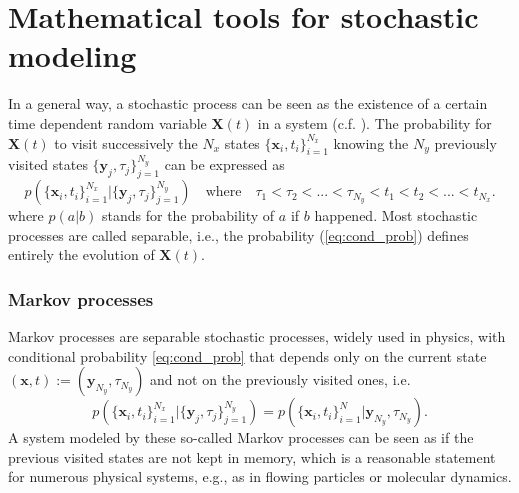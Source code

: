 \section{Mathematical tools for stochastic modeling}
In a general way, a stochastic process can be seen as the existence of a certain time dependent random variable $\textbf{X}(t)$ in a system (c.f. \citet[Sec. 3.1]{Gardiner1996}). The probability for $\textbf{X}(t)$ to visit successively the $N_x$ states $\{\textbf{x}_i,t_i\}_{i=1}^{N_x}$ knowing the $N_y$ previously visited states $\{\textbf{y}_j,\tau_j\}_{j=1}^{N_y}$  can be expressed as
\begin{equation}\label{eq:cond_prob}
p(\{\textbf{x}_i,t_i\}_{i=1}^{N_x}|\{\textbf{y}_j,\tau_j\}_{j=1}^{N_y})\quad\textrm{where}\quad \tau_1<\tau_2<...<\tau_{N_y}<t_1<t_2<...<t_{N_x}.
\end{equation}
where $p(a|b)$ stands for the probability of $a$ if $b$ happened.
Most stochastic processes are called separable, i.e., the probability (\ref{eq:cond_prob}) defines entirely the evolution of $\textbf{X}(t)$.

\subsubsection{Markov processes}
Markov processes are separable stochastic processes, widely used in physics, with conditional probability \eqref{eq:cond_prob} that depends only on the current state $(\textbf{x},t):=(\textbf{y}_{N_y},\tau_{N_y})$ and not on the previously visited ones, i.e. 
\[
p(\{\textbf{x}_i,t_i\}_{i=1}^{N_x}|\{\textbf{y}_j,\tau_j\}_{j=1}^{N_y})=p(\{\textbf{x}_i,t_i\}_{i=1}^N|\textbf{y}_{N_y},\tau_{N_y}).
\]
A system modeled by these so-called Markov processes can be seen as if the previous visited states are not kept in memory, which is a reasonable statement for numerous physical systems, e.g., as in flowing particles or molecular dynamics.
